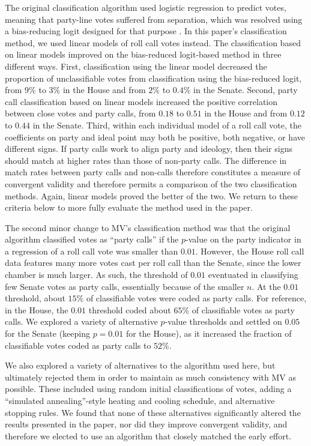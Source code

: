 \documentclass[12pt]{article}
\begin{document}
The original classification algorithm used logistic regression to predict votes,
meaning that party-line votes suffered from separation, which was resolved using
a bias-reducing logit designed for that purpose \citep{Zorn:2005}.
In this paper's classification method, we used linear models of roll call votes
instead.
The classification based on linear models improved
on the bias-reduced logit-based method in three different ways.
First, classification using the linear model decreased the proportion of
unclassifiable votes from classification using the bias-reduced logit,
from $9\%$ to $3\%$ in the House and
from $2\%$ to $0.4\%$ in the Senate.
Second, party call classification based on linear models increased the positive
correlation between close votes and party calls,
from $0.18$ to $0.51$ in the House and
from $0.12$ to $0.44$ in the Senate.
Third, within each individual model of a roll call vote, the coefficients on
party and ideal point may both be positive, both negative, or have different
signs.
If party calls work to align party and ideology, then their signs should
match at higher rates than those of non-party calls.
The difference in match rates between party calls and non-calls therefore
constitutes a measure of convergent validity and therefore permits a comparison
of the two classification methods.
Again, linear models proved the better of the two.
We return to these criteria below to more fully evaluate the method used
in the paper.

The second minor change to MV's classification method was that the original
algorithm classified votes as ``party calls'' if the $p$-value on the party
indicator in a regression of a roll call vote was smaller than $0.01$.
However, the House roll call data features many more votes cast per roll call
than the Senate, since the lower chamber is much larger.
As such, the threshold of $0.01$ eventuated in classifying few
Senate votes as party calls, essentially because of the smaller $n$.
At the $0.01$ threshold, about $15\%$ of classifiable votes were coded as party
calls.
For reference, in the House, the $0.01$ threshold coded about $65\%$ of
classifiable votes as party calls.
We explored a variety of alternative $p$-value thresholds and settled on $0.05$
for the Senate (keeping $p = 0.01$ for the House), as it
increased the fraction of classifiable votes coded as party calls to $52\%$.

We also explored a variety of alternatives to the algorithm used here, but
ultimately rejected them in order to maintain as much consistency with MV as
possible.
These included using random initial classifications of votes, adding a
``simulated annealing''-style heating and cooling schedule, and alternative
stopping rules.
We found that none of these alternatives significantly altered the results
presented in the paper, nor did they improve convergent validity, and therefore
we elected to use an algorithm that closely matched the early effort.
\end{document}
